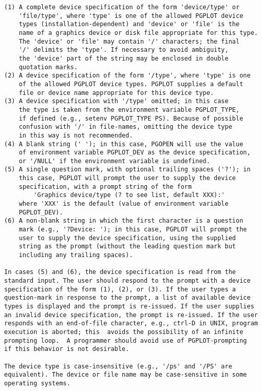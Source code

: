 {\begin{verbatim}
(1) A complete device specification of the form 'device/type' or
    'file/type', where 'type' is one of the allowed PGPLOT device
    types (installation-dependent) and 'device' or 'file' is the 
    name of a graphics device or disk file appropriate for this type.
    The 'device' or 'file' may contain '/' characters; the final
    '/' delimits the 'type'. If necessary to avoid ambiguity,
    the 'device' part of the string may be enclosed in double
    quotation marks.
(2) A device specification of the form '/type', where 'type' is one
    of the allowed PGPLOT device types. PGPLOT supplies a default
    file or device name appropriate for this device type.
(3) A device specification with '/type' omitted; in this case
    the type is taken from the environment variable PGPLOT_TYPE,
    if defined (e.g., setenv PGPLOT_TYPE PS). Because of possible
    confusion with '/' in file-names, omitting the device type
    in this way is not recommended.
(4) A blank string (' '); in this case, PGOPEN will use the value
    of environment variable PGPLOT_DEV as the device specification,
    or '/NULL' if the environment variable is undefined.
(5) A single question mark, with optional trailing spaces ('?'); in
    this case, PGPLOT will prompt the user to supply the device
    specification, with a prompt string of the form
        'Graphics device/type (? to see list, default XXX):'
    where 'XXX' is the default (value of environment variable
    PGPLOT_DEV).
(6) A non-blank string in which the first character is a question
    mark (e.g., '?Device: '); in this case, PGPLOT will prompt the
    user to supply the device specification, using the supplied
    string as the prompt (without the leading question mark but
    including any trailing spaces).

In cases (5) and (6), the device specification is read from the
standard input. The user should respond to the prompt with a device
specification of the form (1), (2), or (3). If the user types a 
question-mark in response to the prompt, a list of available device
types is displayed and the prompt is re-issued. If the user supplies
an invalid device specification, the prompt is re-issued. If the user
responds with an end-of-file character, e.g., ctrl-D in UNIX, program
execution is aborted; this  avoids the possibility of an infinite
prompting loop.  A programmer should avoid use of PGPLOT-prompting
if this behavior is not desirable.

The device type is case-insensitive (e.g., '/ps' and '/PS' are 
equivalent). The device or file name may be case-sensitive in some
operating systems.


\end{verbatim}}
